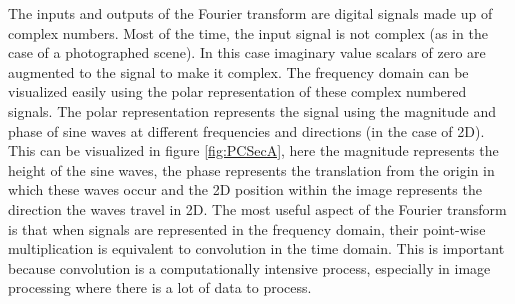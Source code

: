 The inputs and outputs of the Fourier transform are digital signals made up of complex numbers. Most of the time, the input signal is not complex (as in the case of a photographed scene). In this case imaginary value scalars of zero are augmented to the signal to make it complex. The frequency domain can be visualized easily using the polar representation of these complex numbered signals. The polar representation represents the signal using the magnitude and phase of sine waves at different frequencies and directions (in the case of 2D). This can be visualized in figure \ref{fig:PCSecA}, here the magnitude represents the height of the sine waves, the phase represents the translation from the origin in which these waves occur and the 2D position within the image represents the direction the waves travel in 2D. The most useful aspect of the Fourier transform is that when signals are represented in the frequency domain, their point-wise multiplication is equivalent to convolution in the time domain. This is important because convolution is a computationally intensive process, especially in image processing where there is a lot of data to process. \\

